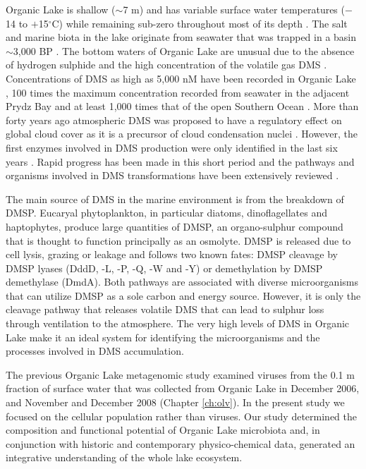 Organic Lake is shallow ($\sim$7 m) and has variable surface water temperatures ($-$14 to $+$15$^{\circ}$C) while remaining sub-zero throughout most of its depth \cite{Franzmann1987b, Gibson1991, Roberts1993b, Gibson1999}.
The salt and marine biota in the lake originate from seawater that was trapped in a basin $\sim$3,000 BP \cite{Zwartz1998, Bird1991}. 
The bottom waters of Organic Lake are unusual due to the absence of hydrogen sulphide and the high concentration of the volatile gas \ac{DMS} \cite{Deprez1986, Franzmann1987b, Gibson1991, Roberts1993a, Roberts1993b}. 
Concentrations of \ac{DMS} as high as 5,000 nM have been recorded in Organic Lake \cite{Gibson1991}, 100 times the maximum concentration recorded from seawater in the adjacent Prydz Bay and at least 1,000 times that of the open Southern Ocean \cite{Curran1998}.
More than forty years ago atmospheric \ac{DMS} was proposed to have a regulatory effect on global cloud cover as it is a precursor of cloud condensation nuclei \cite{Lovelock1972, Charlson1987}.
However, the first enzymes involved in \ac{DMS} production were only identified in the last six years \cite{Todd2007}.
Rapid progress has been made in this short period and the pathways and organisms involved in \ac{DMS} transformations have been extensively reviewed \cite{Johnston2008, Schafer2010, Curson2011b, Reisch2011b, Moran2012}. 

The main source of \ac{DMS} in the marine environment is from the breakdown of \ac{DMSP}. 
Eucaryal phytoplankton, in particular diatoms, dinoflagellates and haptophytes, produce large quantities of \ac{DMSP}, an organo-sulphur compound that is thought to function principally as an osmolyte. 
\ac{DMSP} is released due to cell lysis, grazing or leakage and follows two known fates: \ac{DMSP} cleavage by \ac{DMSP} lyases (DddD, -L, -P, -Q, -W and -Y) or demethylation by \ac{DMSP} demethylase (DmdA).
 Both pathways are associated with diverse microorganisms that can utilize \ac{DMSP} as a sole carbon and energy source. 
However, it is only the cleavage pathway that releases volatile \ac{DMS} that can lead to sulphur loss through ventilation to the atmosphere.
The very high levels of \ac{DMS} in Organic Lake make it an ideal system for identifying the microorganisms and the processes involved in \ac{DMS} accumulation. 

The previous Organic Lake metagenomic study examined viruses from the 0.1 \textmu{}m fraction of surface water that was collected from Organic Lake in December 2006, and November and December 2008 \cite{Yau2011} (Chapter \ref{ch:olv}). 
In the present study we focused on the cellular population rather than viruses. 
Our study determined the composition and functional potential of Organic Lake microbiota and, in conjunction with historic and contemporary physico-chemical data, generated an integrative understanding of the whole lake ecosystem. 

